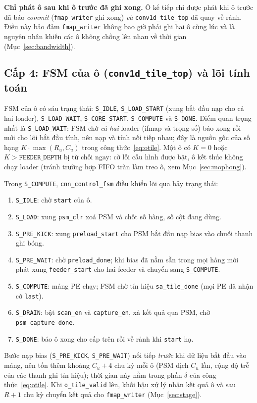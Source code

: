 \textbf{Chỉ phát ô sau khi ô trước đã ghi xong.} Ô kế tiếp chỉ được phát khi ô trước đã báo \emph{commit} (\texttt{fmap\_writer} ghi xong) \emph{và} \texttt{conv1d\_tile\_top} đã quay về rảnh.
Điều này bảo đảm \texttt{fmap\_writer} không bao giờ phải ghi hai ô cùng lúc và là nguyên nhân khiến các ô không chồng lên nhau về thời gian (Mục~\ref{sec:bandwidth}).

\subsection{Cấp 4: FSM của ô (\texttt{conv1d\_tile\_top}) và lõi tính toán}
FSM của ô có sáu trạng thái: \texttt{S\_IDLE}, \texttt{S\_LOAD\_START} (xung bắt đầu nạp cho cả hai loader), \texttt{S\_LOAD\_WAIT}, \texttt{S\_CORE\_START}, \texttt{S\_COMPUTE} và \texttt{S\_DONE}.
Điểm quan trọng nhất là \texttt{S\_LOAD\_WAIT}: FSM chờ \emph{cả hai} loader (ifmap và trọng số) báo xong rồi mới cho lõi bắt đầu tính, nên nạp và tính nối tiếp nhau; đây là nguồn gốc của số hạng $K\cdot\max(R_u,C_u)$ trong công thức~\eqref{eq:otile}.
Một ô có $K=0$ hoặc $K>\texttt{FEEDER\_DEPTH}$ bị từ chối ngay: cờ lỗi cấu hình được bật, ô kết thúc không chạy loader (tránh trường hợp FIFO tràn làm treo ô, xem Mục~\ref{sec:mophong}).

Trong \texttt{S\_COMPUTE}, \texttt{cnn\_control\_fsm} điều khiển lõi qua bảy trạng thái:
\begin{enumerate}
  \item \texttt{S\_IDLE}: chờ \texttt{start} của ô.
  \item \texttt{S\_LOAD}: xung \texttt{psm\_clr} xoá PSM và chốt số hàng, số cột đang dùng.
  \item \texttt{S\_PRE\_KICK}: xung \texttt{preload\_start} cho PSM bắt đầu nạp bias vào chuỗi thanh ghi bóng.
  \item \texttt{S\_PRE\_WAIT}: chờ \texttt{preload\_done}; khi bias đã nằm sẵn trong mọi hàng mới phát xung \texttt{feeder\_start} cho hai feeder và chuyển sang \texttt{S\_COMPUTE}.
  \item \texttt{S\_COMPUTE}: mảng PE chạy; FSM chờ tín hiệu \texttt{sa\_tile\_done} (mọi PE đã nhận cờ \texttt{last}).
  \item \texttt{S\_DRAIN}: bật \texttt{scan\_en} và \texttt{capture\_en}, xả kết quả qua PSM, chờ \texttt{psm\_capture\_done}.
  \item \texttt{S\_DONE}: báo ô xong cho cấp trên rồi về rảnh khi \texttt{start} hạ.
\end{enumerate}
Bước nạp bias (\texttt{S\_PRE\_KICK}, \texttt{S\_PRE\_WAIT}) nối tiếp \emph{trước} khi dữ liệu bắt đầu vào mảng, nên tốn thêm khoảng $C_u+4$ chu kỳ mỗi ô (PSM dịch $C_u$ lần, cộng độ trễ của các thanh ghi tín hiệu); thời gian này nằm trong phần $\delta$ của công thức~\eqref{eq:otile}.
Khi \texttt{o\_tile\_valid} lên, khối hậu xử lý nhận kết quả ô và sau $R+1$ chu kỳ chuyển kết quả cho \texttt{fmap\_writer} (Mục~\ref{sec:stage}).

